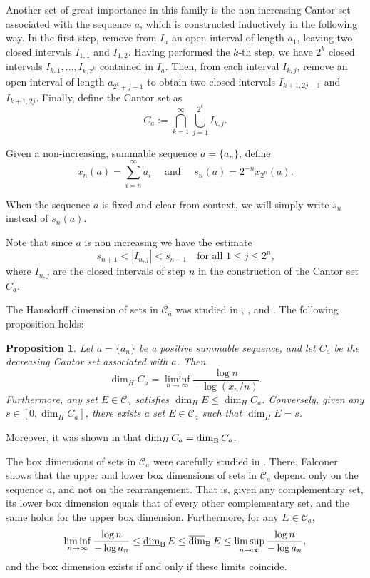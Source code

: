 \documentclass[11pt,reqno,bookmarksnumbered,raiselinks,breaklinks,colorlinks,plainpages]{amsart}
\newcommand\ubd{\overline{\mbox{\rm dim}}_{\rm B}\,} %
\newcommand\lbd{\underline{\mbox{\rm dim}}_{\rm B}\,} %
\newtheorem{prop}[theo]{Proposition}
\begin{document}
Another set of great importance in this family is the non-increasing Cantor set associated with the sequence $a$, which is constructed inductively in the following way. In the first step, remove from $I_a$ an open interval of length $a_1$, leaving two closed intervals $I_{1,1}$ and $I_{1,2}$. Having performed the $k$-th step, we have $2^k$ closed intervals $I_{k,1},...,I_{k,2^{k}}$ contained in $I_a$. Then, from each interval $I_{k,j}$, remove an open interval of length $a_{2^k +j-1}$ to obtain two closed intervals $I_{k+1,2j -1}$ and $I_{k+1,2j}$. Finally, define the Cantor set as $$C_a := \displaystyle\bigcap_{k=1}^{\infty}\bigcup_{j=1}^{2^{k}} I_{k,j}.$$


Given a non-increasing, summable sequence $a=\{a_n\}$, define
\[
\displaystyle x_n(a)=\sum_{i=n}^{\infty}a_i
\quad \text{ and }\quad s_n(a)=2^{-n} x_{2^n}(a).\]


When the sequence $a$ is fixed and clear from context, we will simply write $s_n$ instead of $s_n (a)$.

Note that since $a$ is non increasing we have the estimate  
\[s_{n+1} < |I_{n,j}| < s_{n-1}
\quad \text{for all $1 \leq j \leq 2^n$,}\]
where $I_{n,j}$ are the closed intervals of step $n$ in the construction of the Cantor set $C_{a}$.

The Hausdorff dimension of sets in $\mathcal{C}_a$ was studied in \cite{BeyTa}, \cite{cabrelli2010classifying}, and \cite{garcia2007dimension}. The following proposition holds:

\begin{prop}\label{hausdorff cantor}
Let $a = \{a_n\}$ be a positive summable sequence, and let $C_a$ be the decreasing Cantor set associated with $a$. Then
\[
\dim_H C_{a} = \liminf_{n \to \infty} \frac{\log n}{-\log (x_n/n)}.
\]
Furthermore, any set $E \in \mathcal{C}_{a}$ satisfies $\dim_H E \leq \dim_H C_{a}$. Conversely, given any $s \in [0, \dim_H C_{a}]$, there exists a set $E \in \mathcal{C}_a$ such that $\dim_H E = s$.
\end{prop}

Moreover, it was shown in \cite[Proposition 3.3]{garcia2007dimension} that $\dim_H C_a = \lbd C_a$.

The box dimensions of sets in $\mathcal{C}_a$ were carefully studied in \cite[Chapter 3.2]{falconer1997techniques}. There, Falconer shows that the upper and lower box dimensions of sets in $\mathcal{C}_a$ depend only on the sequence $a$, and not on the rearrangement. That is, given any complementary set, its lower box dimension equals that of every other complementary set, and the same holds for the upper box dimension. Furthermore, for any $E \in \mathcal{C}_a$,
\[
\liminf_{n \to \infty} \frac{\log n}{-\log a_n} \leq \lbd E \leq \ubd E \leq \limsup_{n \to \infty} \frac{\log n}{-\log a_n},
\]
and the box dimension exists if and only if these limits coincide.
\end{document}
